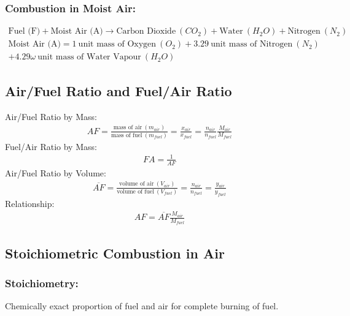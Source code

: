 \subsubsection{Combustion in Moist Air:}
\begin{gather*}
  \text{Fuel (F)} + \text{Moist Air (A)} \longrightarrow \text{Carbon Dioxide} \ (CO_2) + \text{Water} \ (H_2O) + \text{Nitrogen} \ (N_2) \\[5pt]
  \text{Moist Air (A)} = 1 \ \text{unit mass of Oxygen} \ (O_2) + 3.29 \ \text{unit mass of Nitrogen} \ (N_2) \\
  + 4.29\omega \ \text{unit mass of Water Vapour} \ (H_2O)
\end{gather*}
\subsection{Air/Fuel Ratio and Fuel/Air Ratio}
Air/Fuel Ratio by Mass:
\begin{gather}
  AF = \frac{\text{mass of air}\ (m_{air})}{\text{mass of fuel}\ (m_{fuel})} = \frac{x_{air}}{x_{fuel}} = \frac{n_{air}}{n_{fuel}}\frac{M_{air}}{M_{fuel}}
\end{gather}
Fuel/Air Ratio by Mass:
\begin{gather}
  FA = \frac{1}{AF}
\end{gather}
Air/Fuel Ratio by Volume:
\begin{gather}
  \overline{AF} = \frac{\text{volume of air}\ (V_{air})}{\text{volume of fuel}\ (V_{fuel})} = \frac{n_{air}}{n_{fuel}} = \frac{y_{air}}{y_{fuel}}
\end{gather}
Relationship:
\begin{gather}
  AF = \overline{AF}\frac{M_{air}}{M_{fuel}}
\end{gather}
\subsection{Stoichiometric Combustion in Air}
\subsubsection{Stoichiometry:}
Chemically exact proportion of fuel and air for complete burning of fuel.
